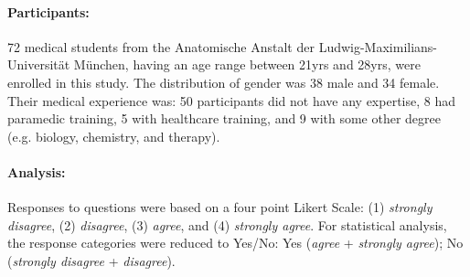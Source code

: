 {{{{{\paragraph{Participants:} 72 medical students from the Anatomische Anstalt der Ludwig-Maximilians-Universit\"at M\"unchen, having an age range between 21yrs and 28yrs, were enrolled in this study. The distribution of gender was 38 male and 34 female. Their medical experience was: 50 participants did not have any expertise, 8 had paramedic training, 5 with healthcare training, and 9 with some other degree (e.g. biology, chemistry, and therapy). 

\paragraph{Analysis:} Responses to questions were based on a four point Likert Scale: (1) \textit{strongly disagree}, (2) \textit{disagree}, (3) \textit{agree}, and (4) \textit{strongly agree}. For statistical analysis, the response categories were reduced to Yes/No: Yes (\textit{agree} + \textit{strongly agree}); No (\textit{strongly disagree} + \textit{disagree}).

}}}}}
